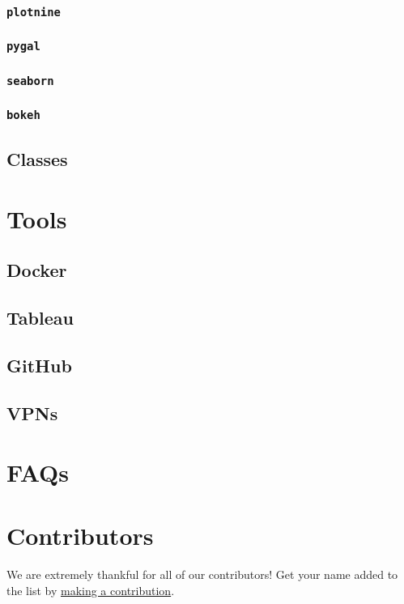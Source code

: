 \documentclass[
]{book}
\begin{document}
\hypertarget{p-plotnine}{%
\subsection{\texorpdfstring{\texttt{plotnine}}{plotnine}}\label{p-plotnine}}

\hypertarget{p-pygal}{%
\subsection{\texorpdfstring{\texttt{pygal}}{pygal}}\label{p-pygal}}

\hypertarget{p-seaborn}{%
\subsection{\texorpdfstring{\texttt{seaborn}}{seaborn}}\label{p-seaborn}}

\hypertarget{p-bokeh}{%
\subsection{\texorpdfstring{\texttt{bokeh}}{bokeh}}\label{p-bokeh}}

\hypertarget{p-classes}{%
\section{Classes}\label{p-classes}}

\hypertarget{tools}{%
\chapter{Tools}\label{tools}}

\hypertarget{docker}{%
\section{Docker}\label{docker}}

\hypertarget{tableau}{%
\section{Tableau}\label{tableau}}

\hypertarget{github}{%
\section{GitHub}\label{github}}

\hypertarget{vpns}{%
\section{VPNs}\label{vpns}}

\hypertarget{faqs}{%
\chapter{FAQs}\label{faqs}}

\hypertarget{contributors}{%
\chapter{Contributors}\label{contributors}}

We are extremely thankful for all of our contributors! Get your name added to the list by \protect\hyperlink{how-to-contribute}{making a contribution}.
\end{document}
